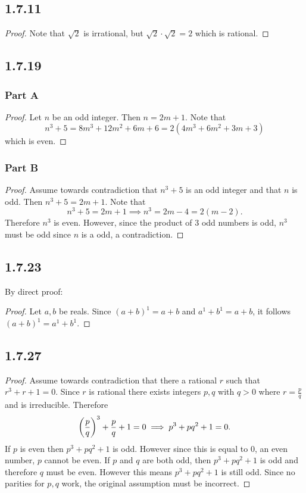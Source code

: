 \documentclass[12pt,titlepage]{extarticle}
\begin{document}
\subsection*{1.7.11}
\begin{proof}
    Note that $ \sqrt{2} $ is irrational, but $ \sqrt{2} \cdot \sqrt{2} = 2 $ which is rational.
\end{proof}

\subsection*{1.7.19}
\subsubsection*{Part A}
\begin{proof}
    Let $n$ be an odd integer. Then $n = 2m + 1$. Note that
    \[
        n^3 + 5 = 8m^3 + 12m^2 + 6m + 6 = 2(4m^3 + 6m^2 + 3m + 3)
    \]
    which is even.
\end{proof}

\subsubsection*{Part B}
\begin{proof}
    Assume towards contradiction that $n^3 + 5$ is an odd integer and that $n$ is odd. Then $n^3 + 5 = 2m + 1$. Note that 
    \[
        n^3 + 5 = 2m + 1 \implies n^3 = 2m - 4 = 2(m - 2)
    .\]
    Therefore $n^3$ is even. However, since the product of 3 odd numbers is odd, $n^3$ must be odd since $n$ is a odd, a contradiction.
\end{proof}

\subsection*{1.7.23}
By direct proof:

\begin{proof}
    Let $a,b$ be reals. Since $(a + b)^1 = a + b$ and $a^1 + b^1 = a + b$, it follows $(a + b)^1 = a^1 + b^1$.
\end{proof}

\subsection*{1.7.27}
\begin{proof}
    Assume towards contradiction that there a rational $r$ such that $r^3 + r + 1 = 0$. Since $r$ is rational there exists integers $p,q$ with $q > 0$ where $r = \frac{p}{q}$ and is irreducible. Therefore
    \[
        \qty(\frac{p}{q})^3 + \frac{p}{q} + 1 = 0 \implies p^3 + pq^2 + 1 = 0
    .\]
    If $p$ is even then $p^3 + pq^2 + 1$ is odd. However since this is equal to $0$, an even number, $p$ cannot be even. If $p$ and $q$ are both odd, then $p^3 + pq^2 + 1$ is odd and therefore $q$ must be even. However this means $p^3 + pq^2 + 1$ is still odd. Since no parities for $p,q$ work, the original assumption must be incorrect.
\end{proof}
\end{document}
